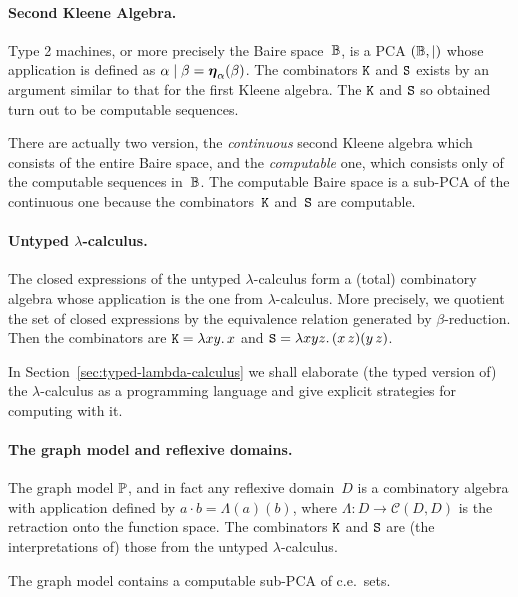 \paragraph{Second Kleene Algebra.}

Type 2 machines, or more precisely the Baire space~$\mathbb{B}$, is a PCA
$(\mathbb{B}, {\mid})$ whose application is defined as $\alpha \mid \beta
= \text{\boldmath{$\eta$}}_{\alpha}(\beta)$. The combinators $\mathtt{K}$ and $\mathtt{S}$ exists
by an argument similar to that for the first Kleene algebra. The
$\mathtt{K}$ and $\mathtt{S}$ so obtained turn out to be computable sequences.

There are actually two version, the \emph{continuous} second Kleene
algebra which consists of the entire Baire space, and the
\emph{computable} one, which consists only of the computable sequences
in~$\mathbb{B}$. The computable Baire space is a sub-PCA of the continuous
one because the combinators~$\mathtt{K}$ and~$\mathtt{S}$ are computable.

\paragraph{Untyped $\lambda$-calculus.}

The closed expressions of the untyped $\lambda$-calculus form a
(total) combinatory algebra whose application is the one from
$\lambda$-calculus. More precisely, we quotient the set of closed
expressions by the equivalence relation generated by
$\beta$-reduction. Then the combinators are $\mathtt{K} = \lambda x y .\,x$
and $\mathtt{S} = \lambda x y z .\,(x \, z)(y \, z)$.

In Section~\ref{sec:typed-lambda-calculus} we shall elaborate
(the typed version of) the $\lambda$-calculus as a programming
language and give explicit strategies for computing with it.


\paragraph{The graph model and reflexive domains.}

The graph model $\mathbb{P}$, and in fact any reflexive domain~$D$ is a
combinatory algebra with application defined by $a \cdot b =
\Lambda(a)(b)$, where $\Lambda : D \to \mathcal{C}(D, D)$ is the
retraction onto the function space. The combinators $\mathtt{K}$ and
$\mathtt{S}$ are (the interpretations of) those from the untyped
$\lambda$-calculus.

The graph model contains a computable sub-PCA of c.e.~sets.


